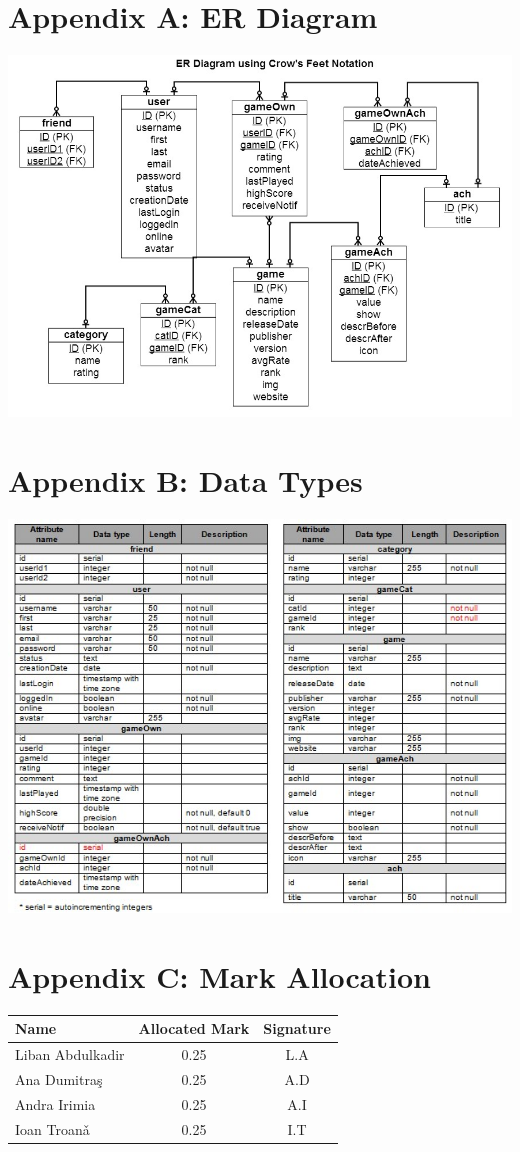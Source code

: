 \documentclass{article}
\begin{document}
\chapter{\textbf{Appendix A: ER Diagram}}
\begin{center}
\includegraphics[width=0.80\columnwidth]{er} %
\end{center}

\chapter{\textbf{Appendix B: Data Types}}
\begin{center}
\includegraphics[width=0.80\columnwidth]{types} %
\end{center}

\chapter{\textbf{Appendix C: Mark Allocation}}
\begin{center}
    \begin{tabular}{| l | c | c |}
    \hline
    \textbf{Name} & \textbf{Allocated Mark} & \textbf{Signature} \\ \hline
    Liban Abdulkadir & 0.25 & L.A \\ \hline
    Ana Dumitra\c{s} & 0.25 & A.D \\ \hline
    Andra Irimia & 0.25 & A.I \\ \hline
    Ioan Troan\v{a} & 0.25 & I.T \\ \hline
    \end{tabular}
\end{center}
\end{document}
